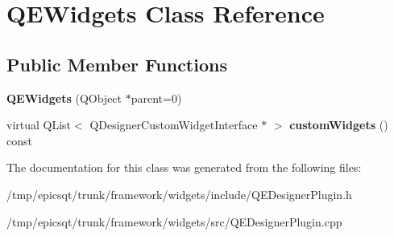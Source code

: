 \hypertarget{classQEWidgets}{
\section{QEWidgets Class Reference}
\label{classQEWidgets}
}
\subsection*{Public Member Functions}
\begin{DoxyCompactItemize}
\item 
\hypertarget{classQEWidgets_a264f48db5f689daefeb3b0cbfeec0be8}{
{\bfseries QEWidgets} (QObject $\ast$parent=0)}
\label{classQEWidgets_a264f48db5f689daefeb3b0cbfeec0be8}

\item 
\hypertarget{classQEWidgets_a0b28a8432e051e96180ed45d9b835376}{
virtual QList$<$ QDesignerCustomWidgetInterface $\ast$ $>$ {\bfseries customWidgets} () const }
\label{classQEWidgets_a0b28a8432e051e96180ed45d9b835376}

\end{DoxyCompactItemize}


The documentation for this class was generated from the following files:\begin{DoxyCompactItemize}
\item 
/tmp/epicsqt/trunk/framework/widgets/include/QEDesignerPlugin.h\item 
/tmp/epicsqt/trunk/framework/widgets/src/QEDesignerPlugin.cpp\end{DoxyCompactItemize}
